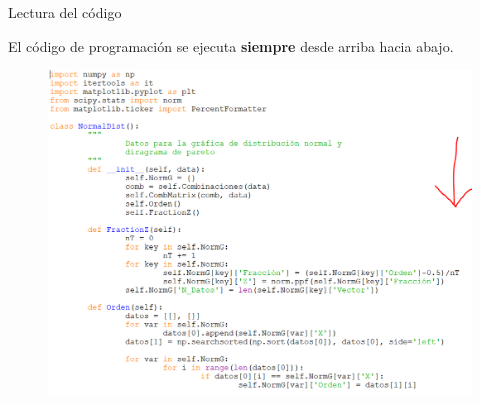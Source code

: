 \begin{frame}[t]{Lectura del código}\vspace{10pt}

El código de programación se ejecuta \textbf{siempre} desde arriba hacia abajo.

\begin{figure}
	\includegraphics[scale=0.5]{Images/Lectura.PNG}
\end{figure}

\end{frame}